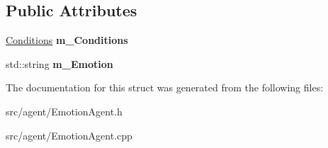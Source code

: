 \subsection*{Public Attributes}
\begin{DoxyCompactItemize}
\item 
\mbox{\label{struct_emotion_agent_1_1_touch_response_a2b2aeff302f885ac1aafa8d498b04348}} 
\hyperlink{class_emotion_agent_a1578745a702913f10ace02142df6163f}{Conditions} {\bfseries m\+\_\+\+Conditions}
\item 
\mbox{\label{struct_emotion_agent_1_1_touch_response_a324d18f33c8dc3bdd1667e0e27a668aa}} 
std\+::string {\bfseries m\+\_\+\+Emotion}
\end{DoxyCompactItemize}


The documentation for this struct was generated from the following files\+:\begin{DoxyCompactItemize}
\item 
src/agent/Emotion\+Agent.\+h\item 
src/agent/Emotion\+Agent.\+cpp\end{DoxyCompactItemize}
